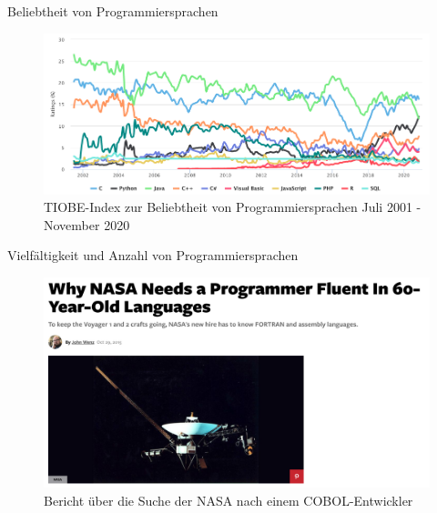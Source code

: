     \begin{frame}{Beliebtheit von Programmiersprachen}
        \begin{figure}
            \centering
            \includegraphics[width=\linewidth,height=0.5\textheight,keepaspectratio]{chapters/04_programming_languages/figures/tiobe_2002-2020.png}
            \caption{TIOBE-Index zur Beliebtheit von Programmiersprachen Juli 2001 - November 2020 \cite{fig:tiobe2001-2019}}
        \end{figure}
    \end{frame}
  
    \begin{frame}{Vielfältigkeit und Anzahl von Programmiersprachen}
        \begin{figure}
            \centering
            \includegraphics[width=\linewidth,height=0.5\textheight,keepaspectratio]{chapters/04_programming_languages/figures/voyager.png}
            \caption{Bericht über die Suche der NASA nach einem COBOL-Entwickler \cite{fig:voyager}}
            
        \end{figure}
        
    \end{frame}
    
